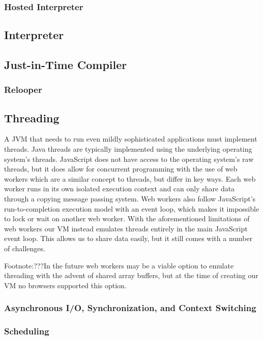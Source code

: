\documentclass{acm_proc_article-sp}
\begin{document}
\subsubsection{Hosted Interpreter}

\subsection{Interpreter}

\subsection{Just-in-Time Compiler}

\subsubsection{Relooper}

\subsection{Threading}

A JVM that needs to run even mildly sophisticated applications must implement threads.
Java threads are typically implemented using the underlying operating system's threads.
JavaScript does not have access to the operating system's raw threads, but it does allow for concurrent programming with the use of web workers which are a similar concept to threads, but differ in key ways.
Each web worker runs in its own isolated execution context and can only share data through a copying message passing system.
Web workers also follow JavaScript's run-to-completion execution model with an event loop, which makes it impossible to lock or wait on another web worker.
With the aforementioned limitations of web workers our VM instead emulates threads entirely in the main JavaScript event loop.
This allows us to share data easily, but it still comes with a number of challenges.

Footnote:???In the future web workers may be a viable option to emulate threading with the advent of shared array buffers, but at the time of creating our VM no browsers supported this option.

\subsubsection{Asynchronous I/O, Synchronization, and Context Switching}

\subsubsection{Scheduling}
\end{document}
